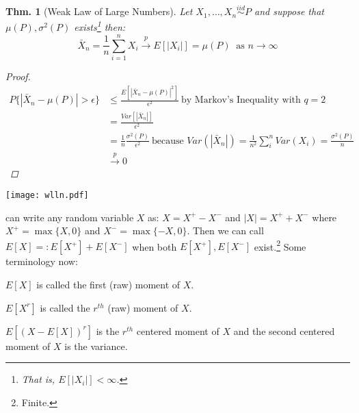 \documentclass{tufte-book}
\theoremstyle{mytheoremstyle}
\newtheorem*{thm}{Thm.}
\theoremstyle{mylemstyle}
\theoremstyle{mydefstyle}
\begin{document}
\begin{thm}[Weak Law of Large Numbers] Let \(X_1, \dots, X_n \overset{iid}{\sim} P\) and suppose that \(\mu(P), \sigma^2(P)\) exists\footnote{That is, \(E[|X_i|] < \infty\).} then:
	\[\bar{X}_n = \frac{1}{n} \sum_{i = 1}^n X_i \overset{p}{\rightarrow} E[|X_i|] = \mu(P)\ \text{ as } n \rightarrow \infty\]
	\begin{proof}
	\begin{align*}
		P\{|\bar{X}_n - \mu(P)| > \epsilon\} & \le \frac{E[|\bar{X}_n - \mu(P)|^2]}{\epsilon^2}\ \text{by Markov's Inequality with \(q = 2\)} \\
										& = \frac{Var[|\bar{X}_n|]}{\epsilon^2} \\
										& = \frac{1}{n} \frac{\sigma^2(P)}{\epsilon^2}\ \text{because \(Var(|\bar{X}_n|) = \frac{1}{n^2}\sum_i^n Var(X_i) = \frac{\sigma^2(P)}{n}\)} \\
										& \overset{p}{\rightarrow} 0
	\end{align*}
	\end{proof}
\end{thm}
\begin{figure*} \texttt{[image: wlln.pdf]} \caption{The moving average of \(X_i \sim \text{Bernoulli}(0.3)\) drawn 1000 times and then replicated 25 times. Seems like the WLLN might be onto something.}\end{figure*}
 can write any random variable \(X\) as: \(X = X^+ - X^-\) and \(|X| =  X^+ + X^-\) where \(X^+ = \max\{X, 0\}\) and \(X^- = \max\{-X, 0\}\). Then we can call \(E[X] =: E[X^+] + E[X^-]\) when both \(E[X^+], E[X^-]\) exist.\footnote{Finite.} Some terminology now:
	\begin{description}
		\item \(E[X]\) is called the first (raw) moment of \(X\).
		\item \(E[X^r]\) is called the \(r^{th}\) (raw) moment of \(X\).
		\item \(E[(X - E[X])^r]\) is the \(r^{th}\) centered moment of \(X\) and the second centered moment of \(X\) is the variance.
	\end{description}
\end{document}
